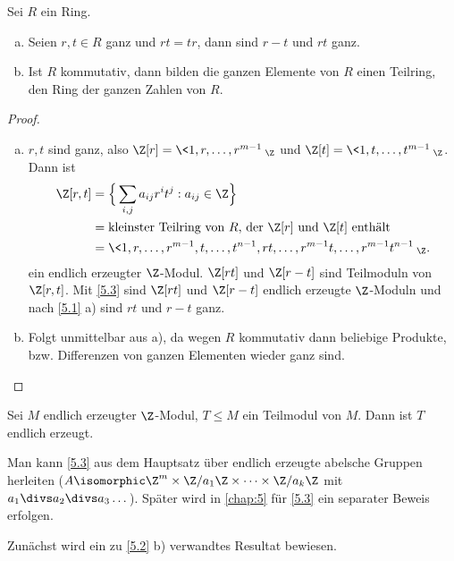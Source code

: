 \begin{st} \label{5.2}
	Sei $R$ ein Ring.
	\begin{enumerate}[a)]
		\item
			Seien $r, t \in R$ ganz und $rt = tr$, dann sind $r - t$ und $rt$ ganz.
		\item
			Ist $R$ kommutativ, dann bilden die ganzen Elemente von $R$ einen Teilring, den Ring der ganzen Zahlen von $R$.
	\end{enumerate}
	\begin{proof}
		\begin{enumerate}[a)]
			\item
				$r, t$ sind ganz, also $\Z[r] = \<1, r, \dotsc, r^{m-1}\>_\Z$ und $\Z[t] = \<1, t, \dotsc, t^{m-1}\>_\Z$.
				Dann ist
				\begin{align*}
					\Z[r, t] &= \Big\{ \sum_{i,j} a_{ij} r^i t^j : a_{ij} \in \Z \Big\} \\
					&= \text{kleinster Teilring von $R$, der $\Z[r]$ und $\Z[t]$ enthält} \\
					&= \<1, r, \dotsc, r^{m-1}, t, \dotsc, t^{n-1}, rt, \dotsc, r^{m-1}t, \dotsc, r^{m-1}t^{n-1}\>_\Z.
				\end{align*}
				ein endlich erzeugter $\Z$-Modul.
				$\Z[rt]$ und $\Z[r-t]$ sind Teilmoduln von $\Z[r,t]$.
				Mit \ref{5.3} sind $\Z[rt]$ und $\Z[r-t]$ endlich erzeugte $\Z$-Moduln und nach \ref{5.1} a) sind $rt$ und $r-t$ ganz.
			\item
				Folgt unmittelbar aus a), da wegen $R$ kommutativ dann beliebige Produkte, bzw. Differenzen von ganzen Elementen wieder ganz sind.
		\end{enumerate}
	\end{proof}
\end{st}

\begin{st} \label{5.3}
	Sei $M$ endlich erzeugter $\Z$-Modul, $T \le M$ ein Teilmodul von $M$.
	Dann ist $T$ endlich erzeugt.
	\begin{note}
		Man kann \ref{5.3} aus dem Hauptsatz über endlich erzeugte abelsche Gruppen herleiten ($A \isomorphic \Z^m \times \Z / a_1 \Z \times \dotsb \times \Z / a_k \Z$ mit $a_1 \divs a_2 \divs a_3 \dotsc$).
		Später wird in \ref{chap:5} für \ref{5.3} ein separater Beweis erfolgen.

		Zunächst wird ein zu \ref{5.2} b) verwandtes Resultat bewiesen.
	\end{note}
\end{st}

